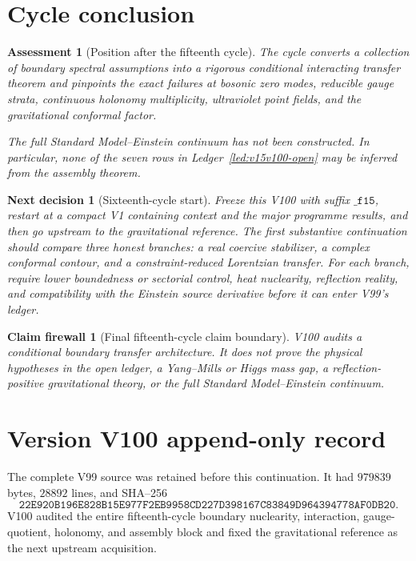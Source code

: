 \documentclass[11pt]{article}
\newtheorem{firewall}[theorem]{Claim firewall}
\newtheorem{decision}[theorem]{Next decision}
\newtheorem{assessment}[theorem]{Assessment}
\theoremstyle{remark}
\begin{document}
\section{Cycle conclusion}

\begin{assessment}[Position after the fifteenth cycle]
\label{ass:v15v100-position}
The cycle converts a collection of boundary spectral assumptions
into a rigorous conditional interacting transfer theorem and
pinpoints the exact failures at bosonic zero modes, reducible gauge
strata, continuous holonomy multiplicity, ultraviolet point fields,
and the gravitational conformal factor.

The full Standard Model--Einstein continuum has not been
constructed.  In particular, none of the seven rows in
Ledger~\ref{led:v15v100-open} may be inferred from the assembly
theorem.
\end{assessment}

\begin{decision}[Sixteenth-cycle start]
\label{dec:v15v100-next}
Freeze this V100 with suffix \(\texttt{\_f15}\), restart at a compact
V1 containing context and the major programme results, and then go
upstream to the gravitational reference.  The first substantive
continuation should compare three honest branches: a real coercive
stabilizer, a complex conformal contour, and a constraint-reduced
Lorentzian transfer.  For each branch, require lower boundedness or
sectorial control, heat nuclearity, reflection reality, and
compatibility with the Einstein source derivative before it can
enter V99's ledger.
\end{decision}

\begin{firewall}[Final fifteenth-cycle claim boundary]
\label{fire:v15v100}
V100 audits a conditional boundary transfer architecture.  It does
not prove the physical hypotheses in the open ledger, a Yang--Mills
or Higgs mass gap, a reflection-positive gravitational theory, or
the full Standard Model--Einstein continuum.
\end{firewall}

\section*{Version V100 append-only record}
The complete V99 source was retained before this continuation.  It
had \(979839\) bytes, \(28892\) lines, and SHA--256
\[
 \texttt{22E920B196E828B15E977F2EB9958CD227D398167C83849D964394778AF0DB20}.
\]
V100 audited the entire fifteenth-cycle boundary nuclearity,
interaction, gauge-quotient, holonomy, and assembly block and fixed
the gravitational reference as the next upstream acquisition.
\end{document}
